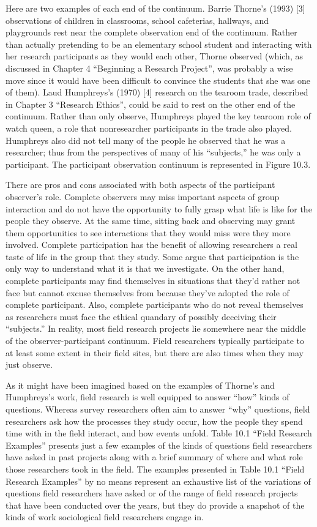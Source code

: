 Here are two examples of each end of the continuum. Barrie Thorne’s (1993) [3] observations of children in classrooms, school cafeterias, hallways, and playgrounds rest near the complete observation end of the continuum. Rather than actually pretending to be an elementary school student and interacting with her research participants as they would each other, Thorne observed (which, as discussed in Chapter 4 ``Beginning a Research Project'', was probably a wise move since it would have been difficult to convince the students that she was one of them). Laud Humphreys’s (1970) [4] research on the tearoom trade, described in Chapter 3 ``Research Ethics'', could be said to rest on the other end of the continuum. Rather than only observe, Humphreys played the key tearoom role of watch queen, a role that nonresearcher participants in the trade also played. Humphreys also did not tell many of the people he observed that he was a researcher; thus from the perspectives of many of his ``subjects,'' he was only a participant. The participant observation continuum is represented in Figure 10.3.

There are pros and cons associated with both aspects of the participant observer's role. Complete observers may miss important aspects of group interaction and do not have the opportunity to fully grasp what life is like for the people they observe. At the same time, sitting back and observing may grant them opportunities to see interactions that they would miss were they more involved. Complete participation has the benefit of allowing researchers a real taste of life in the group that they study. Some argue that participation is the only way to understand what it is that we investigate. On the other hand, complete participants may find themselves in situations that they’d rather not face but cannot excuse themselves from because they’ve adopted the role of complete participant. Also, complete participants who do not reveal themselves as researchers must face the ethical quandary of possibly deceiving their ``subjects.'' In reality, most field research projects lie somewhere near the middle of the observer-participant continuum. Field researchers typically participate to at least some extent in their field sites, but there are also times when they may just observe. 

As it might have been imagined based on the examples of Thorne's and Humphreys's work, field research is well equipped to answer ``how'' kinds of questions. Whereas survey researchers often aim to answer ``why'' questions, field researchers ask how the processes they study occur, how the people they spend time with in the field interact, and how events unfold. Table 10.1 ``Field Research Examples'' presents just a few examples of the kinds of questions field researchers have asked in past projects along with a brief summary of where and what role those researchers took in the field. The examples presented in Table 10.1 ``Field Research Examples'' by no means represent an exhaustive list of the variations of questions field researchers have asked or of the range of field research projects that have been conducted over the years, but they do provide a snapshot of the kinds of work sociological field researchers engage in.

